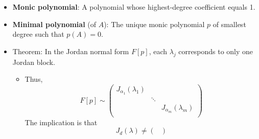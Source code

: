 \documentclass[../notes.tex]{subfiles}
\begin{document}
\begin{itemize}
\begin{itemize}
\begin{proof}
            Do the Laplace expansion with respect to the last column of $A-zI$ (companion) or last row (Frobenius).
        \end{proof}
        \item Roots of $p(z)$ are the eigenvalues of $F[p]$ and $C[p]$.
        \item Claim: $C[p]$ has \textbf{minimal polynomial} $p(z)$.
        \begin{proof}
            We have that $C[p]e_i=e_{i+1}$ for $i=1,\dots,n-1$ and
            \begin{equation*}
                C[p]e_n = -a_0e_1-\cdots-a_{n-1}e_n
            \end{equation*}
            which implies that if $r(z)/\deg r<n$ nullifies $C[p]$, then necessarily $r(z)=p(z)$ since $(z-\lambda_j)^{<\alpha_j}$??
        \end{proof}
        \item Claim: $C[p],F[p]$ have the same Jordan normal form.
        \begin{itemize}
            \item More generally, transpose matrices are similar so they have the same JNF.
        \end{itemize}
    \end{itemize}
    \item \textbf{Monic polynomial}: A polynomial whose highest-degree coefficient equals 1.
    \item \textbf{Minimal polynomial} (of $A$): The unique monic polynomial $p$ of smallest degree such that $p(A)=0$.
    \item Theorem: In the Jordan normal form $F[p]$, each $\lambda_j$ corresponds to only one Jordan block.
    \begin{itemize}
        \item Thus,
        \begin{equation*}
            F[p] \sim
            \begin{pmatrix}
                J_{\alpha_1}(\lambda_1) &  & \\
                 & \ddots & \\
                 &  & J_{\alpha_m}(\lambda_m)\\
            \end{pmatrix}
        \end{equation*}
        The implication is that
        \begin{equation*}
            J_d(\lambda) \neq
            \begin{pmatrix}

\end{pmatrix}
\end{equation*}
\end{itemize}
\end{itemize}
\end{document}
